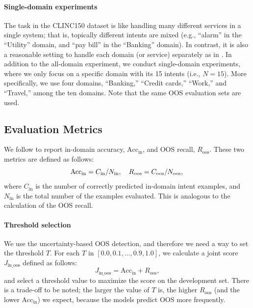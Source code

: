 \paragraph{Single-domain experiments}
The task in the CLINC150 dataset is like handling many different services in a single system; that is, topically different intents are mixed (e.g., ``alarm'' in the ``Utility'' domain, and ``pay bill'' in the ``Banking'' domain).
In contrast, it is also a reasonable setting to handle each domain (or service) separately as in \citet{google-schema-guided}.
In addition to the all-domain experiment, we conduct single-domain experiments, where we only focus on a specific domain with its 15 intents (i.e., $N=15$).
More specifically, we use four domains, ``Banking,'' ``Credit cards,'' ``Work,'' and ``Travel,'' among the ten domains.
Note that the same OOS evaluation sets are used.


\subsection{Evaluation Metrics}
\label{subsection:evalMetrics}

We follow \citet{oos-intent} to report in-domain accuracy, $\mathrm{Acc}_\mathrm{in}$, and OOS recall, $R_\mathrm{oos}$.
These two metrics are defined as follows:
\begin{equation}
        \label{eq:two_metrics}
        \mathrm{Acc}_\mathrm{in} = C_\mathrm{in}/N_\mathrm{in}, ~~~ R_\mathrm{oos} = C_\mathrm{oos}/N_\mathrm{oos}, \\
\end{equation}
where $C_\mathrm{in}$ is the number of correctly predicted in-domain intent examples, and $N_\mathrm{in}$ is the total number of the examples evaluated.
This is analogous to the calculation of the OOS recall.

\paragraph{Threshold selection}
We use the uncertainty-based OOS detection, and therefore we need a way to set the threshold $T$.
For each $T$ in $[0.0, 0.1, \ldots, 0.9, 1.0]$, we calculate a joint score $J_\mathrm{in\_oos}$ defined as follows:
\begin{equation}
\label{eq:joint_score}
J_\mathrm{in\_oos} = \mathrm{Acc}_\mathrm{in} + R_\mathrm{oos},
\end{equation}
and select a threshold value to maximize the score on the development set.
There is a trade-off to be noted; the larger the value of $T$ is, the higher $R_\mathrm{oos}$ (and the lower $\mathrm{Acc}_\mathrm{in}$) we expect, because the models predict OOS more frequently.

